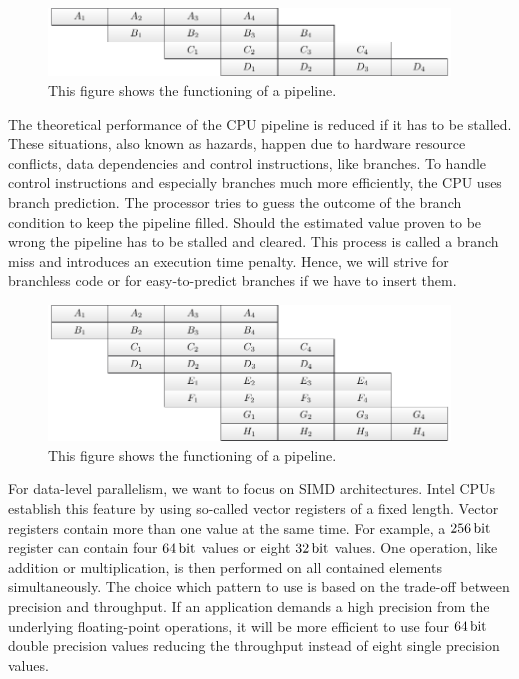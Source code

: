 \documentclass{stdlocal}
\begin{document}
    \begin{figure}
      \center
      \includegraphics[width=0.95\textwidth]{figures/pipeline.pdf}
      \caption[Pipeline Structure]{%
        This figure shows the functioning of a pipeline.
      }
      \label{fig:pipeline}
    \end{figure}
    The theoretical performance of the CPU pipeline is reduced if it has to be stalled.
    These situations, also known as hazards, happen due to hardware resource conflicts, data dependencies and control instructions, like branches.
    To handle control instructions and especially branches much more efficiently, the CPU uses branch prediction.
    The processor tries to guess the outcome of the branch condition to keep the pipeline filled.
    Should the estimated value proven to be wrong the pipeline has to be stalled and cleared.
    This process is called a branch miss and introduces an execution time penalty.
    Hence, we will strive for branchless code or for easy-to-predict branches if we have to insert them.
    \begin{figure}
      \center
      \includegraphics[width=0.95\textwidth]{figures/multiple_unit_pipeline.pdf}
      \caption[Multiple Unit Pipeline Structure]{%
        This figure shows the functioning of a pipeline.
      }
      \label{fig:multiple-unit-pipeline}
    \end{figure}

    For data-level parallelism, we want to focus on SIMD architectures.
    Intel CPUs establish this feature by using so-called vector registers of a fixed length.
    Vector registers contain more than one value at the same time.
    For example, a $256\, \mathrm{bit}$ register can contain four $64\, \mathrm{bit}$ values or eight $32\, \mathrm{bit}$ values.
    One operation, like addition or multiplication, is then performed on all contained elements simultaneously.
    The choice which pattern to use is based on the trade-off between precision and throughput.
    If an application demands a high precision from the underlying floating-point operations, it will be more efficient to use four $64\, \mathrm{bit}$ double precision values reducing the throughput instead of eight single precision values.
\end{document}
